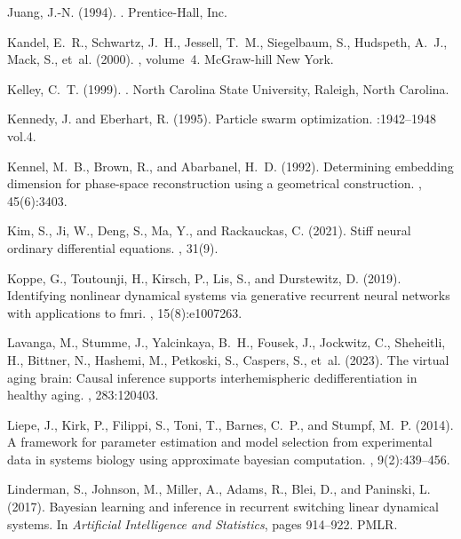 \documentclass[12pt]{article}
\begin{document}
\begin{thebibliography}{}
Juang, J.-N. (1994).
.
\newblock Prentice-Hall, Inc.

Kandel, E.~R., Schwartz, J.~H., Jessell, T.~M., Siegelbaum, S., Hudspeth,
  A.~J., Mack, S., et~al. (2000).
, volume~4.
\newblock McGraw-hill New York.

Kelley, C.~T. (1999).
.
\newblock North Carolina State University, Raleigh, North Carolina.

Kennedy, J. and Eberhart, R. (1995).
\newblock Particle swarm optimization.
:1942--1948 vol.4.

Kennel, M.~B., Brown, R., and Abarbanel, H.~D. (1992).
\newblock Determining embedding dimension for phase-space reconstruction using
  a geometrical construction.
, 45(6):3403.

Kim, S., Ji, W., Deng, S., Ma, Y., and Rackauckas, C. (2021).
\newblock Stiff neural ordinary differential equations.
,
  31(9).

Koppe, G., Toutounji, H., Kirsch, P., Lis, S., and Durstewitz, D. (2019).
\newblock Identifying nonlinear dynamical systems via generative recurrent
  neural networks with applications to fmri.
, 15(8):e1007263.

Lavanga, M., Stumme, J., Yalcinkaya, B.~H., Fousek, J., Jockwitz, C.,
  Sheheitli, H., Bittner, N., Hashemi, M., Petkoski, S., Caspers, S., et~al.
  (2023).
\newblock The virtual aging brain: Causal inference supports interhemispheric
  dedifferentiation in healthy aging.
, 283:120403.

Liepe, J., Kirk, P., Filippi, S., Toni, T., Barnes, C.~P., and Stumpf, M.~P.
  (2014).
\newblock A framework for parameter estimation and model selection from
  experimental data in systems biology using approximate bayesian computation.
, 9(2):439--456.

Linderman, S., Johnson, M., Miller, A., Adams, R., Blei, D., and Paninski, L.
  (2017).
\newblock Bayesian learning and inference in recurrent switching linear
  dynamical systems.
\newblock In {\em Artificial Intelligence and Statistics}, pages 914--922.
  PMLR.


\end{thebibliography}
\end{document}
